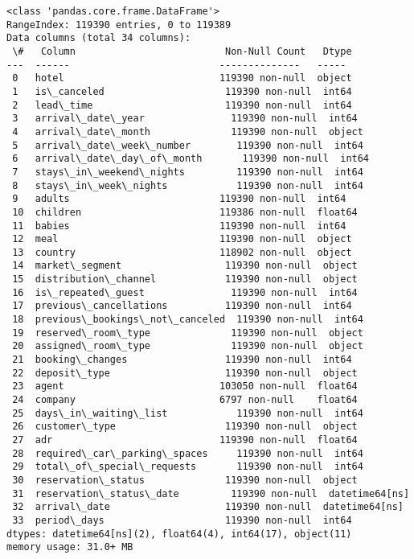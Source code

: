 \documentclass[11pt]{article}
\begin{document}
    \begin{Verbatim}[commandchars=\\\{\}]
<class 'pandas.core.frame.DataFrame'>
RangeIndex: 119390 entries, 0 to 119389
Data columns (total 34 columns):
 \#   Column                          Non-Null Count   Dtype
---  ------                          --------------   -----
 0   hotel                           119390 non-null  object
 1   is\_canceled                     119390 non-null  int64
 2   lead\_time                       119390 non-null  int64
 3   arrival\_date\_year               119390 non-null  int64
 4   arrival\_date\_month              119390 non-null  object
 5   arrival\_date\_week\_number        119390 non-null  int64
 6   arrival\_date\_day\_of\_month       119390 non-null  int64
 7   stays\_in\_weekend\_nights         119390 non-null  int64
 8   stays\_in\_week\_nights            119390 non-null  int64
 9   adults                          119390 non-null  int64
 10  children                        119386 non-null  float64
 11  babies                          119390 non-null  int64
 12  meal                            119390 non-null  object
 13  country                         118902 non-null  object
 14  market\_segment                  119390 non-null  object
 15  distribution\_channel            119390 non-null  object
 16  is\_repeated\_guest               119390 non-null  int64
 17  previous\_cancellations          119390 non-null  int64
 18  previous\_bookings\_not\_canceled  119390 non-null  int64
 19  reserved\_room\_type              119390 non-null  object
 20  assigned\_room\_type              119390 non-null  object
 21  booking\_changes                 119390 non-null  int64
 22  deposit\_type                    119390 non-null  object
 23  agent                           103050 non-null  float64
 24  company                         6797 non-null    float64
 25  days\_in\_waiting\_list            119390 non-null  int64
 26  customer\_type                   119390 non-null  object
 27  adr                             119390 non-null  float64
 28  required\_car\_parking\_spaces     119390 non-null  int64
 29  total\_of\_special\_requests       119390 non-null  int64
 30  reservation\_status              119390 non-null  object
 31  reservation\_status\_date         119390 non-null  datetime64[ns]
 32  arrival\_date                    119390 non-null  datetime64[ns]
 33  period\_days                     119390 non-null  int64
dtypes: datetime64[ns](2), float64(4), int64(17), object(11)
memory usage: 31.0+ MB
    \end{Verbatim}
\end{document}
